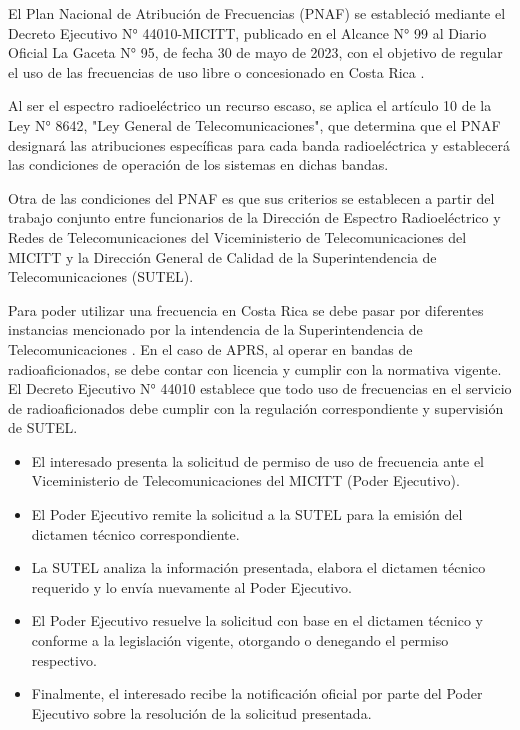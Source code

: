 \documentclass[conference]{IEEEtran}
\begin{document}
El Plan Nacional de Atribución de Frecuencias (PNAF) se estableció mediante el Decreto Ejecutivo N° 44010-MICITT, publicado en el Alcance N° 99 al Diario Oficial La Gaceta N° 95, de fecha 30 de mayo de 2023, con el objetivo de regular el uso de las frecuencias de uso libre o concesionado en Costa Rica \cite{MICITT2023_PNAF}.

Al ser el espectro radioeléctrico un recurso escaso, se aplica el artículo 10 de la Ley N° 8642, "Ley General de Telecomunicaciones", que determina que el PNAF designará las atribuciones específicas para cada banda radioeléctrica y establecerá las condiciones de operación de los sistemas en dichas bandas.

Otra de las condiciones del PNAF es que sus criterios se establecen a partir del trabajo conjunto entre funcionarios de la Dirección de Espectro Radioeléctrico y Redes de Telecomunicaciones del Viceministerio de Telecomunicaciones del MICITT y la Dirección General de Calidad de la Superintendencia de Telecomunicaciones (SUTEL).

Para poder utilizar una frecuencia en Costa Rica se debe pasar por diferentes instancias mencionado por la intendencia de la Superintendencia de Telecomunicaciones \cite{SUTEL_SolicitudUsoFrecuencias}. En el caso de APRS, al operar en bandas de radioaficionados, se debe contar con licencia y cumplir con la normativa vigente. El Decreto Ejecutivo N° 44010 establece que todo uso de frecuencias en el servicio de radioaficionados debe cumplir con la regulación correspondiente y supervisión de SUTEL.

\begin{itemize}
    \item El interesado presenta la solicitud de permiso de uso de frecuencia ante el Viceministerio de Telecomunicaciones del MICITT (Poder Ejecutivo).
    \item El Poder Ejecutivo remite la solicitud a la SUTEL para la emisión del dictamen técnico correspondiente.
    \item La SUTEL analiza la información presentada, elabora el dictamen técnico requerido y lo envía nuevamente al Poder Ejecutivo.
    \item El Poder Ejecutivo resuelve la solicitud con base en el dictamen técnico y conforme a la legislación vigente, otorgando o denegando el permiso respectivo.
    \item Finalmente, el interesado recibe la notificación oficial por parte del Poder Ejecutivo sobre la resolución de la solicitud presentada.
\end{itemize}
\end{document}
